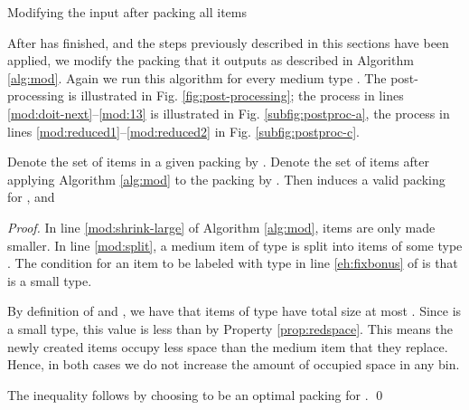 \begin{algorithm}[ht]
\caption{\label{alg:mod}
Modifying the input after packing all items}
\begin{algorithmic}[1]
	\label{mod:doit-next}
	\label{mod:shrink-large}
	\State{}\label{mod:13}
\EndFor
\end{algorithmic}
\end{algorithm}

After {\EHarm} has finished, and the steps previously described in this sections have been applied,
we modify the packing that it outputs as described in Algorithm \ref{alg:mod}. 
Again we run this algorithm for every medium type .
The post-processing is illustrated in Fig. \ref{fig:post-processing}; the process in lines \ref{mod:doit-next}--\ref{mod:13} is illustrated in Fig. \ref{subfig:postproc-a}, the process in lines \ref{mod:reduced1}--\ref{mod:reduced2} in Fig. \ref{subfig:postproc-c}.
\begin{lemma}
\label{lem:noincrease}
Denote the set of items in a given packing  by .
Denote the set of items after applying Algorithm \ref{alg:mod} to the packing  by . Then  induces a valid packing for , and

\end{lemma}
\begin{proof}
In line \ref{mod:shrink-large} of Algorithm \ref{alg:mod}, items are only made smaller. In line \ref{mod:split}, a medium item of type  is split into  items of some type . 
The condition for an item to be labeled with type  in line \ref{eh:fixbonus} of 
{\EHarm} is that  is a small type.

By definition of  and , 
we have that  items of type  have
total size at most . Since  is a small type, this value is less than  by Property \ref{prop:redspace}.
This means the newly created items occupy less space than the medium item that they replace. Hence, in both cases we do not increase the amount of occupied space in any bin.

The inequality follows by choosing  to be an optimal packing for .
\qed\end{proof}

